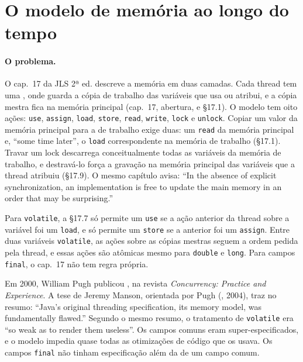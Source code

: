 \section{O modelo de memória ao longo do tempo}
\label{sec:jmm-historia}

\paragraph{O problema.}
O cap.~17 da JLS 2ª ed. descreve a memória em duas camadas. Cada
thread tem uma , onde guarda a cópia de
trabalho das variáveis que usa ou atribui, e a cópia mestra fica na
memória principal (cap.~17, abertura, e §17.1). O modelo tem oito
ações: \texttt{use}, \texttt{assign}, \texttt{load}, \texttt{store},
\texttt{read}, \texttt{write}, \texttt{lock} e \texttt{unlock}. Copiar
um valor da memória principal para a de trabalho exige duas: um
\texttt{read} da memória principal e, \enquote{some time later}, o
\texttt{load} correspondente na memória de trabalho (§17.1). Travar um
lock descarrega conceitualmente todas as variáveis da memória de
trabalho, e destravá-lo força a gravação na memória principal das
variáveis que a thread atribuiu (§17.9). O mesmo capítulo avisa:
\enquote{In the absence of explicit synchronization, an implementation
is free to update the main memory in an order that may be surprising.}

Para \texttt{volatile}, a §17.7 só permite um \texttt{use} se a ação
anterior da thread sobre a variável foi um \texttt{load}, e só permite
um \texttt{store} se a anterior foi um \texttt{assign}. Entre duas
variáveis \texttt{volatile}, as ações sobre as cópias mestras seguem
a ordem pedida pela thread, e essas ações são atômicas mesmo para
\texttt{double} e \texttt{long}. Para campos \texttt{final}, o
cap.~17 não tem regra própria.

Em 2000, William Pugh publicou
, na revista
\emph{Concurrency: Practice and Experience}. A tese de Jeremy Manson,
orientada por Pugh (, 2004),
traz no resumo: \enquote{Java's original threading
specification, its memory model, was fundamentally flawed.} Segundo o
mesmo resumo, o tratamento de \texttt{volatile} era \enquote{so weak
as to render them useless}. Os campos comuns eram super-especificados,
e o modelo impedia quase todas as otimizações de código que os usava.
Os campos \texttt{final} não tinham especificação além da de um campo
comum.

